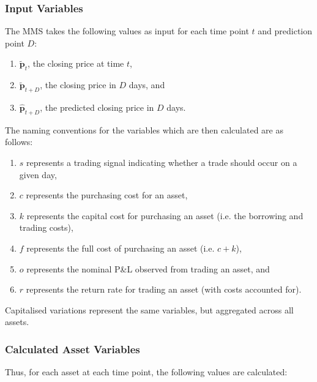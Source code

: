 \documentclass[a4paper,11pt,oneside]{article}
\theoremstyle{plain}
\theoremstyle{definition}
\begin{document}
	\subsubsection{Input Variables}
	
	The MMS takes the following values as input for each time point $t$  and prediction point $D$:
	\begin{enumerate}
		\item {$\mathbf{\tilde{p}}_t$}, the closing price at time $t$, 
		\item $\mathbf{\tilde{p}}_{t+D}$, the closing price in $D$ days, and
		\item $\hat{\mathbf{p}}_{t+D}$, the predicted closing price in $D$ days.
	\end{enumerate}
	
	The naming conventions for the variables which are then calculated are as follows:
	
		\begin{enumerate}
		\item $s$ represents a trading signal indicating whether a trade should occur on a given day, 
		\item $c$ represents the purchasing cost for an asset, 
		\item $k$ represents the capital cost for purchasing an asset (i.e. the borrowing and trading costs), 
		\item $f$ represents the full cost of purchasing an asset (i.e. $c +k$), 
		\item $o$ represents the nominal P\&L observed from trading an asset, and
		\item $r$ represents the return rate  for trading an asset (with costs accounted for).
	\end{enumerate}
	
	Capitalised variations represent the same variables, but aggregated across all assets.
	
	\subsubsection{Calculated Asset Variables}
	
	Thus, for each asset at each time point, the following values are calculated:
	
\end{document}
